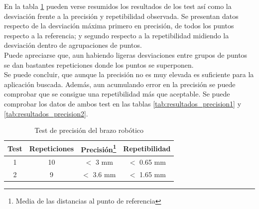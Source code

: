 	En la tabla \ref{tab:resultados_precision} pueden verse resumidos los resultados de los test así como la desviación frente a la precisión y repetibilidad observada. Se presentan datos respecto de la desviación máxima primero en precisión, de todos los puntos respecto a la referencia; y segundo respecto a la repetibilidad midiendo la desviación dentro de agrupaciones de puntos.
	\\
	
	Puede apreciarse que, aun habiendo ligeras desviaciones entre grupos de puntos se dan bastantes repeticiones donde los puntos se superponen. 
	\\
	
	Se puede concluir, que aunque la precisión no es muy elevada es suficiente para la aplicación buscada. Además, aun acumulando error en la precisión se puede comprobar que se consigue una repetibilidad más que aceptable. Se puede comprobar los datos de ambos test en las tablas \ref{tab:resultados_precision1} y \ref{tab:resultados_precision2}.
	
	\begin{table}[htbp]
		\centering
		\caption{Test de precisión del brazo robótico}
		\label{tab:resultados_precision}
		\begin{center}
			\begin{tabular}{|c|c|c|c|}
				\hline
				\textbf{Test} & \textbf{Repeticiones} & \textbf{Precisión}\footnote{Media de las distancias al punto de referencia} & \textbf{Repetibilidad} \\
				\hline
				1 & 10 & $<$ 3 mm & $<$ 0.65 mm \\
				\hline
				2 & 9 & $<$ 3.6 mm  & $<$ 1.65 mm \\
				\hline
			\end{tabular}
		\end{center}
	\end{table}
	
